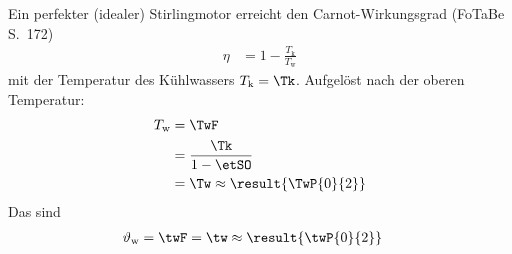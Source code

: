Ein perfekter (idealer) Stirlingmotor erreicht den Carnot-Wirkungsgrad (FoTaBe S.~172)
\begin{align}
 \eta &= 1-\frac{T_\text{k}}{T_\text{w}}
\end{align}
mit der Temperatur des Kühlwassers $T_\text{k} = \Tk$. Aufgelöst nach der oberen Temperatur:
\begin{align}
 T_\text{w} &= \TwF \\
   &= \frac{\Tk}{1-\etSO} \\
   &= \Tw \approx \result{\TwP{0}{2}}
\end{align}
Das sind
\begin{align}
 \vartheta_\text{w} &= \twF = \tw \approx \result{\twP{0}{2}}
\end{align}

